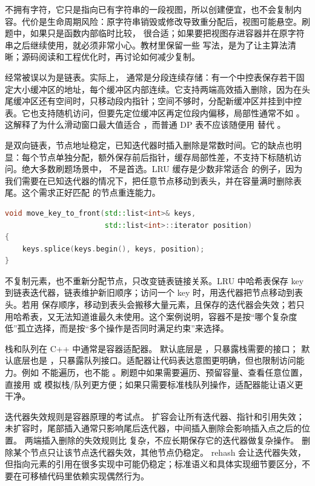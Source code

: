  不拥有字符，它只是指向已有字符串的一段视图，所以创建便宜，也不会复制内容。代价是生命周期风险：原字符串销毁或修改导致重分配后，视图可能悬空。刷题中，如果只是函数内部临时比较， 很合适；如果要把视图存进容器并在原字符串之后继续使用，就必须非常小心。教材里保留一些  写法，是为了让主算法清晰；源码阅读和工程优化时，再讨论如何减少复制。

 经常被误以为是链表。实际上， 通常是分段连续存储：有一个中控表保存若干固定大小缓冲区的地址，每个缓冲区内部连续。它支持两端高效插入删除，因为在头尾缓冲区还有空间时，只移动段内指针；空间不够时，分配新缓冲区并挂到中控表。它也支持随机访问，但要先定位缓冲区再定位段内偏移，局部性通常不如 。这解释了为什么滑动窗口最大值适合 ，而普通 DP 表不应该随便用  替代 。

 是双向链表，节点地址稳定，已知迭代器时插入删除是常数时间。它的缺点也明显：每个节点单独分配，额外保存前后指针，缓存局部性差，不支持下标随机访问。绝大多数刷题场景中， 不是首选。LRU 缓存是少数非常适合  的例子，因为我们需要在已知迭代器的情况下，把任意节点移动到表头，并在容量满时删除表尾。这个需求正好匹配  的节点重连能力。

\begin{lstlisting}[language=C++,caption={list::splice：节点移动而不是复制元素}]
void move_key_to_front(std::list<int>& keys,
                       std::list<int>::iterator position)
{
    keys.splice(keys.begin(), keys, position);
}
\end{lstlisting}

 不复制元素，也不重新分配节点，只改变链表链接关系。LRU 中哈希表保存 key 到链表迭代器，链表维护新旧顺序；访问一个 key 时，用迭代器把节点移动到表头。若用  保存顺序，移动到表头会搬移大量元素，且保存的迭代器会失效；若只用哈希表，又无法知道谁最久未使用。这个案例说明，容器不是按“哪个复杂度低”孤立选择，而是按“多个操作是否同时满足约束”来选择。

栈和队列在 C++ 中通常是容器适配器。  默认底层是 ，只暴露栈需要的接口； 默认底层也是 ，只暴露队列接口。适配器让代码表达意图更明确，但也限制访问能力。例如  不能遍历，也不能 。刷题中如果需要遍历、预留容量、查看任意位置，直接用  或  模拟栈/队列更方便；如果只需要标准栈队列操作，适配器能让语义更干净。

迭代器失效规则是容器原理的考试点。  扩容会让所有迭代器、指针和引用失效；未扩容时，尾部插入通常只影响尾后迭代器，中间插入删除会影响插入点之后的位置。  两端插入删除的失效规则比  复杂，不应长期保存它的迭代器做复杂操作。  删除某个节点只让该节点迭代器失效，其他节点仍稳定。  rehash 会让迭代器失效，但指向元素的引用在很多实现中可能仍稳定；标准语义和具体实现细节要区分，不要在可移植代码里依赖实现偶然行为。

